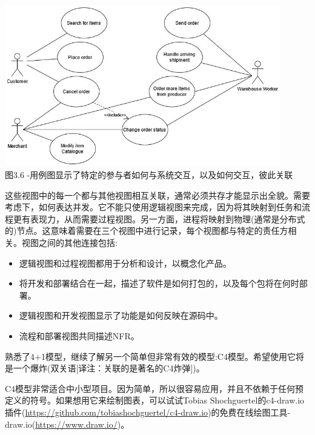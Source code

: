 \begin{itemize}
\begin{center}
\includegraphics[width=0.9\textwidth]{content/1/chapter3/images/6.jpg}\\
图3.6 -用例图显示了特定的参与者如何与系统交互，以及如何交互，彼此关联
\end{center}

\end{itemize}

这些视图中的每一个都与其他视图相互关联，通常必须共存才能显示出全貌。需要考虑下，如何表达并发。它不能只使用逻辑视图来完成，因为将其映射到任务和流程更有表现力，从而需要过程视图。另一方面，进程将映射到物理(通常是分布式的)节点。这意味着需要在三个视图中进行记录，每个视图都与特定的责任方相关。视图之间的其他连接包括:

\begin{itemize}
\item
逻辑视图和过程视图都用于分析和设计，以概念化产品。

\item 
将开发和部署结合在一起，描述了软件是如何打包的，以及每个包将在何时部署。

\item
逻辑视图和开发视图显示了功能是如何反映在源码中。

\item
流程和部署视图共同描述NFR。
\end{itemize}

熟悉了4+1模型，继续了解另一个简单但非常有效的模型:C4模型。希望使用它将是一个爆炸(双关语[译注：关联的是著名的C4炸弹])。


C4模型非常适合中小型项目。因为简单，所以很容易应用，并且不依赖于任何预定义的符号。如果想用它来绘制图表，可以试试Tobias Shochguertel的c4-draw.io插件(\url{https://github.com/tobiashochguertel/c4-draw.io})的免费在线绘图工具-draw.io(\url{https://www.draw.io/})。

